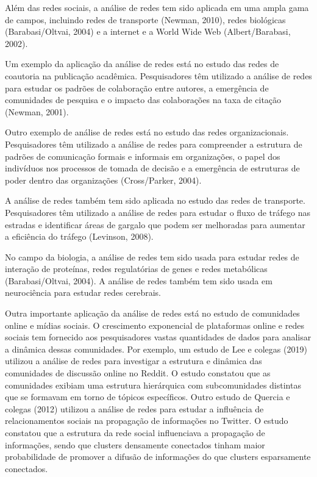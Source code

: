 Além das redes sociais, a análise de redes tem sido aplicada em uma ampla gama de campos, incluindo redes de transporte (Newman, 2010), redes biológicas (Barabasi/Oltvai, 2004) e a internet e a World Wide Web (Albert/Barabasi, 2002).

Um exemplo da aplicação da análise de redes está no estudo das redes de coautoria na publicação acadêmica. Pesquisadores têm utilizado a análise de redes para estudar os padrões de colaboração entre autores, a emergência de comunidades de pesquisa e o impacto das colaborações na taxa de citação (Newman, 2001).

Outro exemplo de análise de redes está no estudo das redes organizacionais. Pesquisadores têm utilizado a análise de redes para compreender a estrutura de padrões de comunicação formais e informais em organizações, o papel dos indivíduos nos processos de tomada de decisão e a emergência de estruturas de poder dentro das organizações (Cross/Parker, 2004).

A análise de redes também tem sido aplicada no estudo das redes de transporte. Pesquisadores têm utilizado a análise de redes para estudar o fluxo de tráfego nas estradas e identificar áreas de gargalo que podem ser melhoradas para aumentar a eficiência do tráfego (Levinson, 2008).

No campo da biologia, a análise de redes tem sido usada para estudar redes de interação de proteínas, redes regulatórias de genes e redes metabólicas (Barabasi/Oltvai, 2004). A análise de redes também tem sido usada em neurociência para estudar redes cerebrais.

Outra importante aplicação da análise de redes está no estudo de comunidades online e mídias sociais. O crescimento exponencial de plataformas online e redes sociais tem fornecido aos pesquisadores vastas quantidades de dados para analisar a dinâmica dessas comunidades. Por exemplo, um estudo de Lee e colegas (2019) utilizou a análise de redes para investigar a estrutura e dinâmica das comunidades de discussão online no Reddit. O estudo constatou que as comunidades exibiam uma estrutura hierárquica com subcomunidades distintas que se formavam em torno de tópicos específicos. Outro estudo de Quercia e colegas (2012) utilizou a análise de redes para estudar a influência de relacionamentos sociais na propagação de informações no Twitter. O estudo constatou que a estrutura da rede social influenciava a propagação de informações, sendo que clusters densamente conectados tinham maior probabilidade de promover a difusão de informações do que clusters esparsamente conectados.

